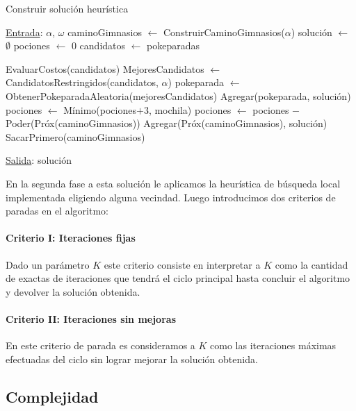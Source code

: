 \begin{algorithm}[H]

\label{}
\caption{Construir soluci\'on heur\'istica}

\begin{algorithmic}[1]

\Statex \underline{Entrada}: $\alpha$, $\omega$
\medskip
\State caminoGimnasios $\gets$ ConstruirCaminoGimnasios($\alpha$)
\State soluci\'on $\gets$ $\emptyset$
\State pociones $\gets$ $0$
\State candidatos $\gets$ pokeparadas

		\State EvaluarCostos(candidatos)
		\State MejoresCandidatos $\gets$ CandidatosRestringidos(candidatos, $\alpha$)
		\State pokeparada $\gets$ ObtenerPokeparadaAleatoria(mejoresCandidatos)
		\State Agregar(pokeparada, soluci\'on)
		\State pociones $\gets$ M\'inimo(pociones$+3$, mochila)
	\EndWhile
	\State pociones $\gets$  pociones $-$ Poder(Pr\'ox(caminoGimnasios))
	\State  Agregar(Pr\'ox(caminoGimnasios), soluci\'on)
	\State  SacarPrimero(caminoGimnasios)
\EndWhile

\medskip
\Statex \underline{Salida}: soluci\'on

\end{algorithmic}
\end{algorithm}

En la segunda fase a esta solución le aplicamos la heurística de búsqueda local implementada eligiendo alguna vecindad. Luego introducimos dos criterios de paradas en el algoritmo:

\paragraph{Criterio I: Iteraciones fijas}
Dado un parámetro $K$ este criterio consiste en interpretar a $K$ como la cantidad de exactas de iteraciones que tendrá el ciclo principal hasta concluir el algoritmo y devolver la solución obtenida.

\paragraph{Criterio II: Iteraciones sin mejoras}
En este criterio de parada es consideramos a $K$ como las iteraciones máximas efectuadas del ciclo sin lograr mejorar la solución obtenida.


\subsection{Complejidad}

